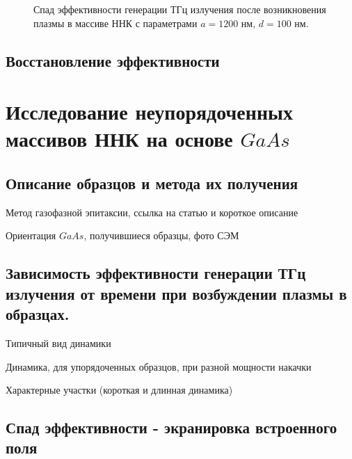 \documentclass[a4paper,14pt,russian]{extreport}
\begin{document}
				\begin{figure}[h!]
					\caption{Спад эффективности генерации ТГц излучения после возникновения плазмы в массиве ННК с параметрами $a = 1200 \text{ нм, } d = 100 \text{ нм}$.}
				\label{ris:short1200100}
				\end{figure}
				
			\subsection{Восстановление эффективности}
		\section{Исследование неупорядоченных массивов ННК на основе $GaAs$}
			\subsection{Описание образцов и метода их получения}
				Метод газофазной эпитаксии, ссылка на
				статью и короткое описание\par
				Ориентация $GaAs$, получившиеся образцы,
				фото СЭМ
			\newpage
			\subsection{Зависимость эффективности генерации ТГц излучения от времени при возбуждении плазмы в образцах.}
				Типичный вид динамики\par
				Динамика, для упорядоченных образцов,
				при разной мощности накачки\par
				Характерные участки (короткая и длинная
				динамика)\par
			\subsection{Спад эффективности - экранировка встроенного поля}
\end{document}
